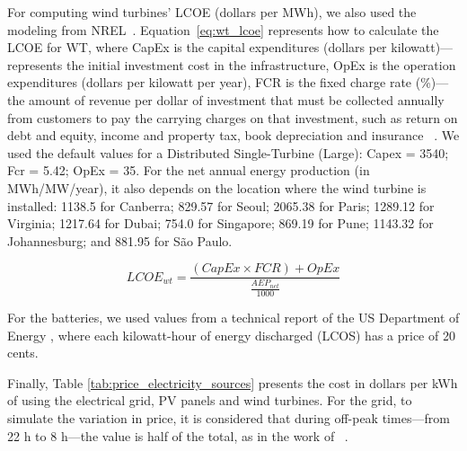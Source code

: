 For computing wind turbines' LCOE (dollars per MWh), we also used the modeling from NREL~\cite{nrel_wt_costs_2021}. Equation~\eqref{eq:wt_lcoe} represents how to calculate the LCOE for WT, where CapEx is the capital expenditures (dollars per kilowatt)---represents the initial investment cost in the infrastructure, OpEx is the operation expenditures (dollars per kilowatt per year), FCR is the fixed charge rate (\%)---the amount of revenue per dollar of investment that must be collected annually from customers to pay the carrying charges on that investment, such as return on debt and equity, income and property tax, book depreciation and insurance ~\cite{nrel_economic_wt_1995}. We used the default values for a Distributed Single-Turbine (Large): Capex = 3540; Fcr = 5.42; OpEx = 35. For the net annual energy production (in MWh/MW/year), it also depends on the location where the wind turbine is installed:  1138.5 for Canberra; 829.57 for Seoul;  2065.38 for Paris; 1289.12 for Virginia;  1217.64 for Dubai;   754.0 for Singapore;  869.19 for Pune;  1143.32 for Johannesburg; and  881.95 for São Paulo.
  
\begin{equation} \label{eq:wt_lcoe}
  LCOE_{wt} = \frac{ (CapEx \times FCR) + OpEx}{ \frac{AEP_{net}}{1000}   }
\end{equation}

For the batteries, we used values from a technical report of the US Department of Energy \cite{battery_lcos_2022}, where each kilowatt-hour of energy discharged (LCOS) has a price of 20 cents.

Finally, Table \ref{tab:price_electricity_sources} presents the cost in dollars per kWh of using the electrical grid, PV panels and wind turbines. For the grid, to simulate the variation in price, it is considered that during off-peak times---from 22 h to 8 h---the value is half of the total, as in the work of ~\citet{KHODAYARSERESHT2023_energycarbonaware_vm}.

